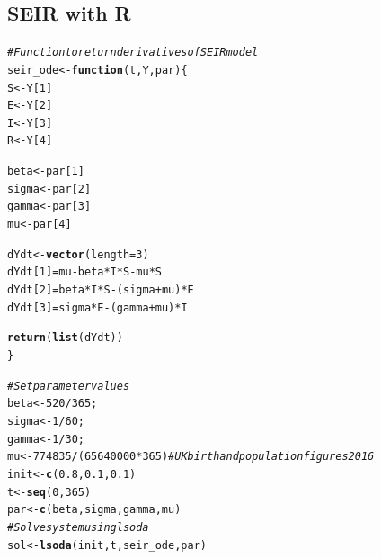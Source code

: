 \documentclass{article}\usepackage[]{graphicx}\usepackage[]{color}
\makeatletter
\newcommand{\hlnum}[1]{\textcolor[rgb]{0.686,0.059,0.569}{#1}}%
\newcommand{\hlcom}[1]{\textcolor[rgb]{0.678,0.584,0.686}{\textit{#1}}}%
\newcommand{\hlopt}[1]{\textcolor[rgb]{0,0,0}{#1}}%
\newcommand{\hlstd}[1]{\textcolor[rgb]{0.345,0.345,0.345}{#1}}%
\newcommand{\hlkwa}[1]{\textcolor[rgb]{0.161,0.373,0.58}{\textbf{#1}}}%
\newcommand{\hlkwb}[1]{\textcolor[rgb]{0.69,0.353,0.396}{#1}}%
\newcommand{\hlkwc}[1]{\textcolor[rgb]{0.333,0.667,0.333}{#1}}%
\newcommand{\hlkwd}[1]{\textcolor[rgb]{0.737,0.353,0.396}{\textbf{#1}}}%
\newenvironment{kframe}{%
 \def\at@end@of@kframe{}%
 \ifinner\ifhmode%
  \def\at@end@of@kframe{\end{minipage}}%
  \begin{minipage}{\columnwidth}%
 \fi\fi%
 \def\FrameCommand##1{\hskip\@totalleftmargin \hskip-\fboxsep
 \colorbox{shadecolor}{##1}\hskip-\fboxsep
     \hskip-\linewidth \hskip-\@totalleftmargin \hskip\columnwidth}%
 \MakeFramed {\advance\hsize-\width
   \@totalleftmargin\z@ \linewidth\hsize
   \@setminipage}}%
 {\par\unskip\endMakeFramed%
 \at@end@of@kframe}
\newenvironment{knitrout}{}{} %
\makeatother
\begin{document}
\subsection{SEIR with R}

\begin{knitrout}
\color{fgcolor}\begin{kframe}
\begin{alltt}
\hlcom{# Function to return derivatives of SEIR model}
\hlstd{seir_ode}\hlkwb{<-}\hlkwa{function}\hlstd{(}\hlkwc{t}\hlstd{,}\hlkwc{Y}\hlstd{,}\hlkwc{par}\hlstd{)\{}
  \hlstd{S}\hlkwb{<-}\hlstd{Y[}\hlnum{1}\hlstd{]}
  \hlstd{E}\hlkwb{<-}\hlstd{Y[}\hlnum{2}\hlstd{]}
  \hlstd{I}\hlkwb{<-}\hlstd{Y[}\hlnum{3}\hlstd{]}
  \hlstd{R}\hlkwb{<-}\hlstd{Y[}\hlnum{4}\hlstd{]}

  \hlstd{beta}\hlkwb{<-}\hlstd{par[}\hlnum{1}\hlstd{]}
  \hlstd{sigma}\hlkwb{<-}\hlstd{par[}\hlnum{2}\hlstd{]}
  \hlstd{gamma}\hlkwb{<-}\hlstd{par[}\hlnum{3}\hlstd{]}
  \hlstd{mu}\hlkwb{<-}\hlstd{par[}\hlnum{4}\hlstd{]}

  \hlstd{dYdt}\hlkwb{<-}\hlkwd{vector}\hlstd{(}\hlkwc{length}\hlstd{=}\hlnum{3}\hlstd{)}
  \hlstd{dYdt[}\hlnum{1}\hlstd{]}\hlkwb{=}\hlstd{mu}\hlopt{-}\hlstd{beta}\hlopt{*}\hlstd{I}\hlopt{*}\hlstd{S}\hlopt{-}\hlstd{mu}\hlopt{*}\hlstd{S}
  \hlstd{dYdt[}\hlnum{2}\hlstd{]}\hlkwb{=}\hlstd{beta}\hlopt{*}\hlstd{I}\hlopt{*}\hlstd{S}\hlopt{-}\hlstd{(sigma}\hlopt{+}\hlstd{mu)}\hlopt{*}\hlstd{E}
  \hlstd{dYdt[}\hlnum{3}\hlstd{]}\hlkwb{=}\hlstd{sigma}\hlopt{*}\hlstd{E}\hlopt{-}\hlstd{(gamma}\hlopt{+}\hlstd{mu)}\hlopt{*}\hlstd{I}

  \hlkwd{return}\hlstd{(}\hlkwd{list}\hlstd{(dYdt))}
\hlstd{\}}


\hlcom{# Set parameter values}
\hlstd{beta}\hlkwb{<-}\hlnum{520}\hlopt{/}\hlnum{365}\hlstd{;}
\hlstd{sigma}\hlkwb{<-}\hlnum{1}\hlopt{/}\hlnum{60}\hlstd{;}
\hlstd{gamma}\hlkwb{<-}\hlnum{1}\hlopt{/}\hlnum{30}\hlstd{;}
\hlstd{mu}\hlkwb{<-}\hlnum{774835}\hlopt{/}\hlstd{(}\hlnum{65640000}\hlopt{*}\hlnum{365}\hlstd{)} \hlcom{# UK birth and population figures 2016}
\hlstd{init}\hlkwb{<-}\hlkwd{c}\hlstd{(}\hlnum{0.8}\hlstd{,}\hlnum{0.1}\hlstd{,}\hlnum{0.1}\hlstd{)}
\hlstd{t}\hlkwb{<-}\hlkwd{seq}\hlstd{(}\hlnum{0}\hlstd{,}\hlnum{365}\hlstd{)}
\hlstd{par}\hlkwb{<-}\hlkwd{c}\hlstd{(beta,sigma,gamma,mu)}
\hlcom{# Solve system using lsoda}
\hlstd{sol}\hlkwb{<-}\hlkwd{lsoda}\hlstd{(init,t,seir_ode,par)}
\end{alltt}
\end{kframe}
\end{knitrout}
\end{document}
